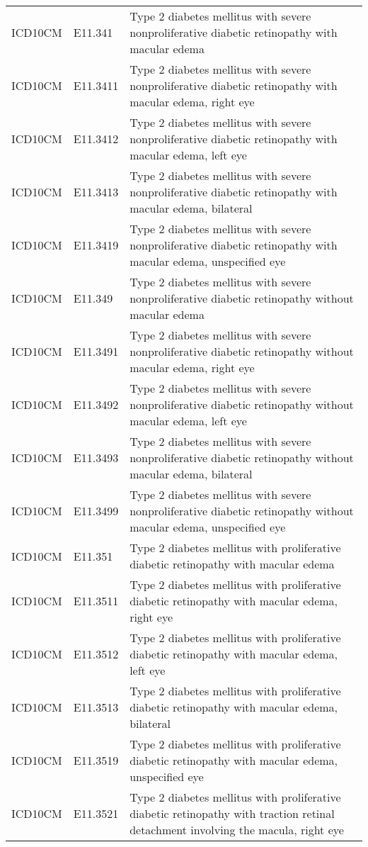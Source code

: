\begin{longtable}{p{}p{}p{}}
  ICD10CM & E11.341 & Type 2 diabetes mellitus with severe nonproliferative diabetic retinopathy with macular edema \\ 
  ICD10CM & E11.3411 & Type 2 diabetes mellitus with severe nonproliferative diabetic retinopathy with macular edema, right eye \\ 
  ICD10CM & E11.3412 & Type 2 diabetes mellitus with severe nonproliferative diabetic retinopathy with macular edema, left eye \\ 
  ICD10CM & E11.3413 & Type 2 diabetes mellitus with severe nonproliferative diabetic retinopathy with macular edema, bilateral \\ 
  ICD10CM & E11.3419 & Type 2 diabetes mellitus with severe nonproliferative diabetic retinopathy with macular edema, unspecified eye \\ 
  ICD10CM & E11.349 & Type 2 diabetes mellitus with severe nonproliferative diabetic retinopathy without macular edema \\ 
  ICD10CM & E11.3491 & Type 2 diabetes mellitus with severe nonproliferative diabetic retinopathy without macular edema, right eye \\ 
  ICD10CM & E11.3492 & Type 2 diabetes mellitus with severe nonproliferative diabetic retinopathy without macular edema, left eye \\ 
  ICD10CM & E11.3493 & Type 2 diabetes mellitus with severe nonproliferative diabetic retinopathy without macular edema, bilateral \\ 
  ICD10CM & E11.3499 & Type 2 diabetes mellitus with severe nonproliferative diabetic retinopathy without macular edema, unspecified eye \\ 
  ICD10CM & E11.351 & Type 2 diabetes mellitus with proliferative diabetic retinopathy with macular edema \\ 
  ICD10CM & E11.3511 & Type 2 diabetes mellitus with proliferative diabetic retinopathy with macular edema, right eye \\ 
  ICD10CM & E11.3512 & Type 2 diabetes mellitus with proliferative diabetic retinopathy with macular edema, left eye \\ 
  ICD10CM & E11.3513 & Type 2 diabetes mellitus with proliferative diabetic retinopathy with macular edema, bilateral \\ 
  ICD10CM & E11.3519 & Type 2 diabetes mellitus with proliferative diabetic retinopathy with macular edema, unspecified eye \\ 
  ICD10CM & E11.3521 & Type 2 diabetes mellitus with proliferative diabetic retinopathy with traction retinal detachment involving the macula, right eye \\ 

\end{longtable}

